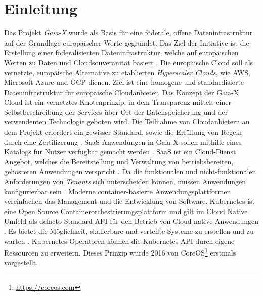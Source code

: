 \chapter{Einleitung}
\label{chap:einleitung}


Das Projekt \emph{Gaia-X} wurde als Basis für eine föderale, offene Dateninfrastruktur auf der Grundlage europäischer Werte gegründet.
Das Ziel der Initiative ist die Erstellung einer föderalisierten Dateninfrastruktur, 
welche auf europäischen Werten zu Daten und Cloudsouveränität basiert \cite{GaiaXArchitecture2021}.
Die europäische Cloud soll als vernetzte, europäische Alternative zu etablierten \emph{Hyperscaler Clouds}, wie \ac{AWS},
Microsoft Azure und \ac{GCP} dienen. Ziel ist eine homogene und standardisierte Dateninfrastruktur für europäische Cloudanbieter.
Das Konzept der Gaia-X Cloud ist ein vernetztes Knotenprinzip, in dem Transparenz mittels einer Selbstbeschreibung der Services
über Ort der Datenspeicherung und der verwendenten Technologie geboten wird.
Die Teilnahme von Cloudanbietern an dem Projekt erfordert ein gewisser Standard, sowie die Erfüllung von Regeln durch eine Zertifizerung \cite{BMWi2019}.
\ac{SaaS} Anwendungen in Gaia-X sollen mithilfe eines Katalogs für Nutzer verfügbar gemacht werden \cite{GXFS2021}.
\ac{SaaS} ist ein Cloud-Dienst Angebot, welches die Bereitstellung und Verwaltung von betriebsbereiten, 
gehosteten Anwendungen verspricht \cite{Krebs2012}.
Da die funktionalen und nicht-funktionalen Anforderungen von \emph{Tenants} sich unterscheiden können,
müssen Anwendungen konfigurierbar sein \cite{Schroeter2012}. 
Moderne container-basierte Anwendungsplattformen vereinfachen das Management und die Entwicklung
von Software. Kubernetes \cite{kubernetes} ist eine Open Source Containerorchestrierungsplattform und gilt im
Cloud Native Umfeld als defacto Standard API für den Betrieb von Cloud-native Anwendungen \cite{Burns2019}.
Es bietet die Möglichkeit, skalierbare und verteilte Systeme zu erstellen und zu warten \cite{Burns2019}.
Kubernetes Operatoren können die Kubernetes API durch eigene Ressourcen zu erweitern. 
Dieses Prinzip wurde 2016 von CoreOS\footnote{\url{https://coreos.com}} erstmals vorgestellt.

